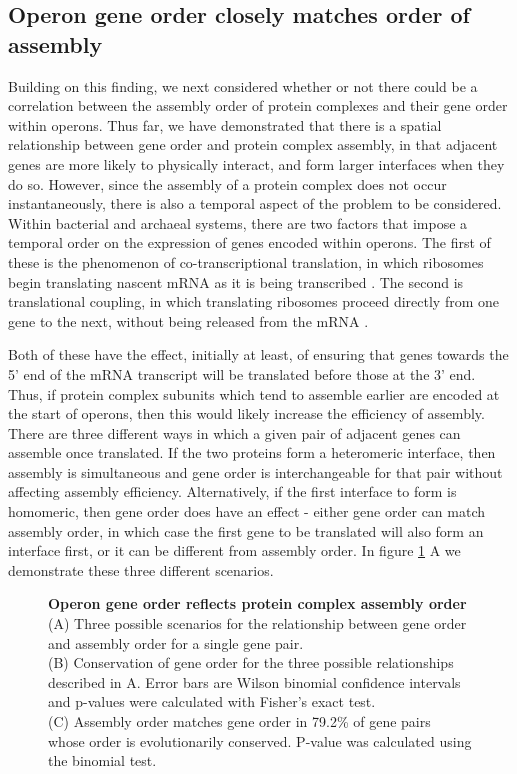 \documentclass[a4paper,11pt,twoside,openright]{scrbook}
\begin{document}
\subsection{Operon gene order closely matches order of assembly}
Building on this finding, we next considered whether or not there could be a correlation between the assembly order of protein complexes and their gene order within operons. Thus far, we have demonstrated that there is a spatial relationship between gene order and protein complex assembly, in that adjacent genes are more likely to physically interact, and form larger interfaces when they do so. However, since the assembly of a protein complex does not occur instantaneously, there is also a temporal aspect of the problem to be considered. Within bacterial and archaeal systems, there are two factors that impose a temporal order on the expression of genes encoded within operons. The first of these is the phenomenon of co-transcriptional translation, in which ribosomes begin translating nascent mRNA as it is being transcribed \cite{Byrne1964,Gowrishankar2004,Kohler2017}. The second is translational coupling, in which translating ribosomes proceed directly from one gene to the next, without being released from the mRNA \cite{Oppenheim1980,Levin-Karp2013}.

Both of these have the effect, initially at least, of ensuring that genes towards the 5' end of the mRNA transcript will be translated before those at the 3' end. Thus, if protein complex subunits which tend to assemble earlier are encoded at the start of operons, then this would likely increase the efficiency of assembly. There are three different ways in which a given pair of adjacent genes can assemble once translated. If the two proteins form a heteromeric interface, then assembly is simultaneous and gene order is interchangeable for that pair without affecting assembly efficiency. Alternatively, if the first interface to form is homomeric, then gene order does have an effect - either gene order can match assembly order, in which case the first gene to be translated will also form an interface first, or it can be different from assembly order. In figure \ref{figure:operonassembly} A we demonstrate these three different scenarios.

\begin{figure}[h]
    \caption[Operon gene order reflects protein complex assembly order]{\sffamily \textbf{Operon gene order reflects protein complex assembly order} \\ \small (A) Three possible scenarios for the relationship between gene order and assembly order for a single gene pair.\\
    (B) Conservation of gene order for the three possible relationships described in A. Error bars are Wilson binomial confidence intervals and p-values were calculated with Fisher's exact test.\\
    (C) Assembly order matches gene order in 79.2\% of gene pairs whose order is evolutionarily conserved. P-value was calculated using the binomial test.}
    \label{figure:operonassembly}
\end{figure}
\end{document}
